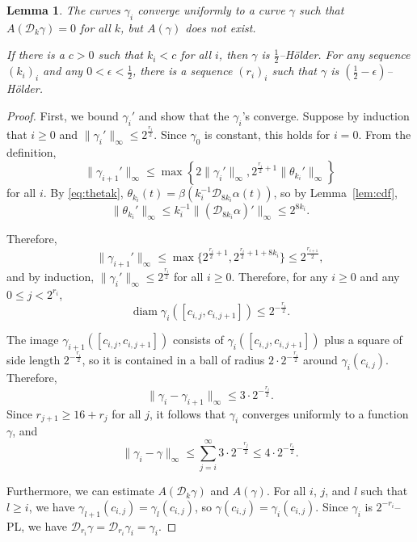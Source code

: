 \documentclass[12pt,reqno]{amsart}
\newcommand{\cD}{\mathcal{D}}
\newtheorem{lemma}[thm]{Lemma}
\theoremstyle{remark}
\newcommand{\0}{\mathbf{0}}
\renewcommand{\1}{\mathbf 1}
\DeclareMathOperator{\diam}{diam}
\begin{document}
\begin{lemma}\label{lem:gamma-i-no-area}
  The curves $\gamma_i$ converge uniformly to a curve $\gamma$ such that $A(\cD_k\gamma) = 0$ for all $k$, but $A(\gamma)$ does not exist.

  If there is a $c>0$ such that $k_i < c$ for all $i$, then $\gamma$ is $\frac{1}{2}$--Hölder. For any sequence $(k_i)_i$ and any $0<\epsilon<\frac{1}{2}$, there is a sequence $(r_i)_i$ such that $\gamma$ is $(\frac{1}{2}-\epsilon)$--Hölder.
\end{lemma}
\begin{proof} 
  First, we bound $\gamma_i'$ and show that the $\gamma_i$'s converge. Suppose by induction that $i\ge 0$ and $\|\gamma_{i}'\|_\infty\le 2^{\frac{r_{i}}{2}}$. Since $\gamma_0$ is constant, this holds for $i=0$. From the definition, 
  $$\|\gamma_{i+1}'\|_\infty \le \max \left\{2 \|\gamma_{i}'\|_\infty, 2^{\frac{r_i}{2} + 1} \|\theta_{k_i}'\|_\infty \right\}$$
  for all $i$. By \eqref{eq:thetak}, $\theta_{k_i}(t) = \beta(k_i^{-1} \cD_{8k_i}\alpha(t))$, so by Lemma~\ref{lem:cdf},
  $$\|\theta_{k_i}'\|_\infty \le k_i^{-1} \|(\cD_{8k_i}\alpha)'\|_\infty\le 2^{8k_i}.$$

  Therefore, 
  \begin{equation}\label{eq:gamma-deriv}
    \|\gamma_{i+1}'\|_\infty \le \max\{2^{\frac{r_i}{2}+1}, 2^{\frac{r_i}{2} + 1 + 8k_i}\} \le 2^{\frac{r_{i+1}}{2}},
  \end{equation}
  and by induction, $\|\gamma_{i}'\|_\infty\le 2^{\frac{r_{i}}{2}}$ for all $i\ge 0$.
  Therefore, for any $i\ge 0$ and any $0\le j < 2^{r_i}$,
  $$\diam \gamma_i([c_{i,j}, c_{i,j+1}]) \le 2^{-\frac{r_i}{2}}.$$

  The image $\gamma_{i+1}([c_{i,j}, c_{i,j+1}])$ consists of $\gamma_i([c_{i,j}, c_{i,j+1}])$ plus a square of side length $2^{-\frac{r_i}{2}}$, so it is contained in a ball of radius $2\cdot 2^{-\frac{r_i}{2}}$ around $\gamma_i(c_{i,j})$. Therefore, 
  $$\|\gamma_i - \gamma_{i+1}\|_\infty \le 3\cdot 2^{-\frac{r_i}{2}}.$$
  Since $r_{j+1} \ge 16 + r_j$ for all $j$, it follows that $\gamma_i$ converges uniformly to a function $\gamma$, and 
  \begin{equation}\label{eq:gamma-convergence}
    \|\gamma_i - \gamma\|_\infty \le \sum_{j=i}^\infty 3\cdot 2^{-\frac{r_j}{2}} \le 4\cdot 2^{-\frac{r_i}{2}}.
  \end{equation}

  Furthermore, we can estimate $A(\cD_k\gamma)$ and $A(\gamma)$. For all $i$, $j$, and $l$ such that $l\ge i$, we have $\gamma_{l+1}(c_{i,j}) = \gamma_{l}(c_{i,j})$, so $\gamma(c_{i,j}) = \gamma_i(c_{i,j})$. Since $\gamma_i$ is $2^{-r_i}$--PL, we have $\cD_{r_i}\gamma = \cD_{r_i}\gamma_i = \gamma_i$.


\end{proof}
\end{document}
